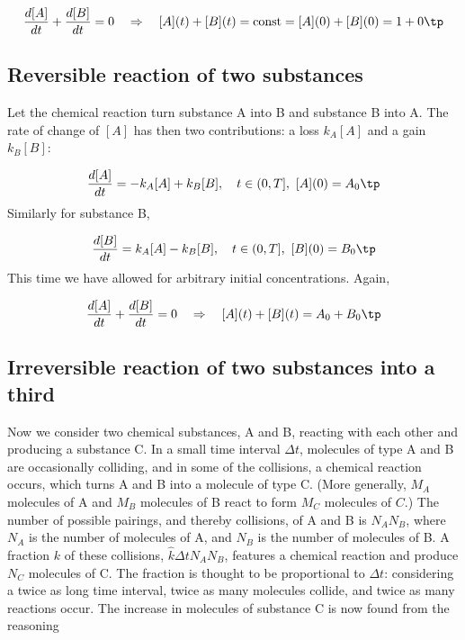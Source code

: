 \documentclass[graybox,sectrefs,envcountresetchap,open=right,final]{svmonodo}
\begin{document}
\[ \frac{d[A]}{dt} + \frac{d[B]}{dt} = 0\quad\Rightarrow\quad
[A](t) + [B](t) = \hbox{const} = [A](0) + [B](0) = 1 + 0\tp\]


\subsection{Reversible reaction of two substances}

Let the chemical reaction turn substance A into B and substance B into A.
The rate of change of $[A]$ has then two contributions: a loss $k_A[A]$
and a gain $k_B[B]$:

\begin{equation}
\frac{d[A]}{dt} = -k_A[A] + k_B[B], \quad t\in (0,T],\ [A](0)=A_0\tp
\end{equation}
Similarly for substance B,

\begin{equation}
\frac{d[B]}{dt} = k_A[A] - k_B[B], \quad t\in (0,T],\ [B](0)=B_0\tp
\end{equation}
This time we have allowed for arbitrary initial concentrations.
Again,

\[ \frac{d[A]}{dt} + \frac{d[B]}{dt} = 0\quad\Rightarrow\quad
[A](t) + [B](t) = A_0+B_0\tp\]

\subsection{Irreversible reaction of two substances into a third}

Now we consider two chemical substances, A and B, reacting with each
other and producing a substance C. In a small time interval $\Delta t$,
molecules of type A and B are occasionally colliding, and in some
of the collisions, a chemical reaction occurs, which turns A and B into
a molecule of type C. (More generally, $M_A$ molecules of A and $M_B$
molecules of B react to form $M_C$ molecules of $C$.)
The number of possible pairings, and thereby collisions, of A and B is
$N_AN_B$, where $N_A$ is the number of molecules of A, and $N_B$ is the
number of molecules of B.
A fraction $k$ of these collisions,
$\hat k\Delta t N_AN_B$, features a chemical reaction and produce
$N_C$ molecules of C. The fraction is thought to be proportional to
$\Delta t$: considering a twice as long time interval, twice as many
molecules collide, and twice as many reactions occur.
The increase in molecules of substance C is now found
from the reasoning
\end{document}
